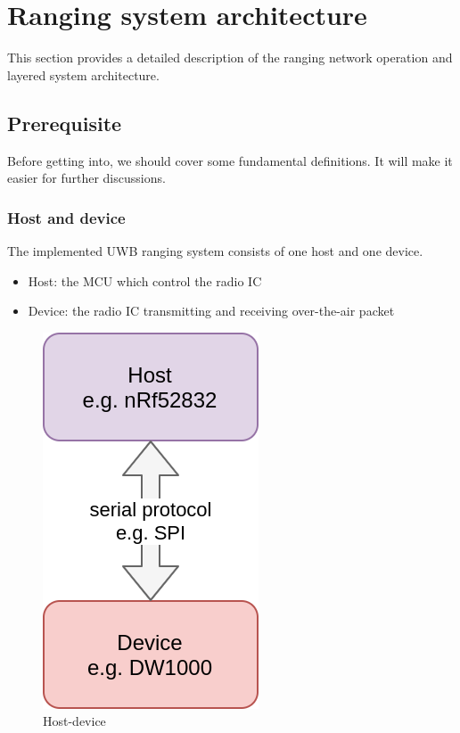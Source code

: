 \documentclass[\main/main.tex]{subfiles}
\begin{document}
\graphicspath{{img/}{03_firmware/img/}}

\chapter{Ranging system architecture}
This section provides a detailed description of the ranging network operation and layered system architecture.

\section{Prerequisite}
Before getting into, we should cover some fundamental definitions. It will make it easier for further discussions. 

\subsection{Host and device}
The implemented UWB ranging system consists of one host and one device.
\begin{itemize}
    \item Host: the MCU which control the radio IC 
    \item Device: the radio IC transmitting and receiving over-the-air packet
\end{itemize}

\begin{figure}[H]
    \begin{center}
        \includegraphics[scale=0.3]{host_device.png}
    \end{center}
    \caption{Host-device}
    \label{fig:host_device}
\end{figure}
\end{document}
